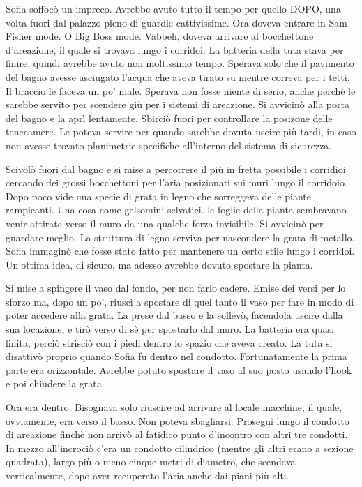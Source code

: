     Sofia soffocò un impreco. Avrebbe avuto tutto il tempo per quello DOPO, una volta fuori dal palazzo pieno di guardie
    cattivissime. Ora doveva entrare in Sam Fisher mode. O Big Boss mode. Vabbeh, doveva arrivare al bocchettone
    d'areazione, il quale si trovava lungo i corridoi. La batteria della tuta stava per finire, quindi avrebbe avuto non
    moltissimo tempo. Sperava solo che il pavimento del bagno avesse asciugato l'acqua che aveva tirato su mentre
    correva per i tetti. Il braccio le faceva un po' male. Sperava non fosse niente di serio, anche perchè le sarebbe
    servito per scendere giù per i sistemi di areazione. Si avvicinò alla porta del bagno e la aprì lentamente. Sbirciò
    fuori per controllare la posizone delle tenecamere. Le poteva servire per quando sarebbe dovuta uscire più tardi, in
    caso non avesse trovato planimetrie specifiche all'interno del sistema di sicurezza.

    Scivolò fuori dal bagno e si mise a percorrere il più in fretta possibile i corridioi cercando dei grossi
    bocchettoni per l'aria posizionati sui muri lungo il corridoio. Dopo poco vide una specie di grata in legno che
    sorreggeva delle piante rampicanti. Una cosa come gelsomini selvatici. le foglie della pianta sembravano venir
    attirate verso il muro da una qualche forza invisibile. Si avvicinò per guardare meglio. La struttura di legno
    serviva per nascondere la grata di metallo. Sofia immaginò che fosse stato fatto per mantenere un certo stile lungo
    i corridoi. Un'ottima idea, di sicuro, ma adesso avrebbe dovuto spostare la pianta.

    Si mise a spingere il vaso dal fondo, per non farlo cadere. Emise dei versi per lo sforzo ma, dopo un po', riuscì a
    spostare di quel tanto il vaso per fare in modo di poter accedere alla grata. La prese dal basso e la sollevò,
    facendola uscire dalla sua locazione, e tirò verso di sè per spostarlo dal muro. La batteria era quasi finita,
    perciò strisciò con i piedi dentro lo spazio che aveva creato. La tuta si disattivò proprio quando Sofia fu dentro
    nel condotto. Fortunatamente la prima parte era orizzontale. Avrebbe potuto spostare il vaso al suo posto usando
    l'hook e poi chiudere la grata.

    Ora era dentro. Bisognava solo riuscire ad arrivare al locale macchine, il quale, ovviamente, era verso il basso.
    Non poteva sbagliarsi. Proseguì lungo il condotto di areazione finchè non arrivò al fatidico punto d'incontro con
    altri tre condotti. In mezzo all'incrociò c'era un condotto cilindrico (mentre gli altri erano a sezione quadrata),
    largo più o meno cinque metri di diametro, che scendeva verticalmente, dopo aver recuperato l'aria anche dai piani
    più alti.

